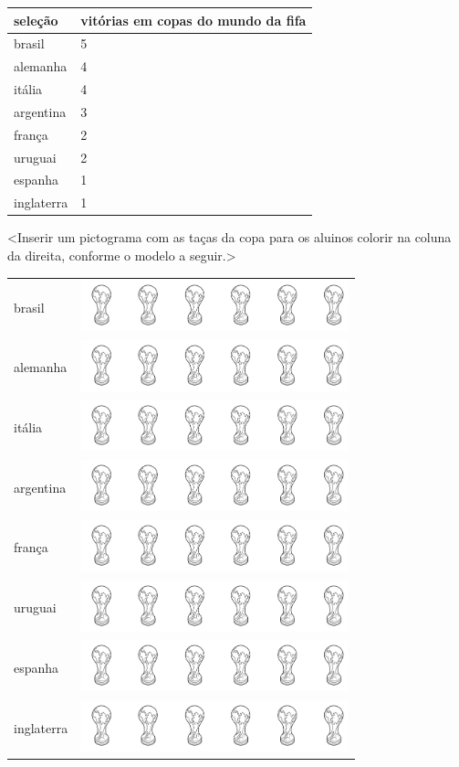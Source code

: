 \begin{longtable}[]{@{}ll@{}}
\toprule
seleção & vitórias em copas do mundo da fifa\tabularnewline
\midrule
\endhead
brasil & 5\tabularnewline
alemanha & 4\tabularnewline
itália & 4\tabularnewline
argentina & 3\tabularnewline
frança & 2\tabularnewline
uruguai & 2\tabularnewline
espanha & 1\tabularnewline
inglaterra & 1\tabularnewline
\bottomrule
\end{longtable}

\textless{}Inserir um pictograma com as taças da copa para os aluinos
colorir na coluna da direita, conforme o modelo a seguir.\textgreater{}

\begin{longtable}[]{@{}ll@{}}
\toprule
brasil &
\includegraphics[width=3.05575in,height=0.58176in]{media/image105.png}\tabularnewline
alemanha &
\includegraphics[width=3.05575in,height=0.58176in]{media/image105.png}\tabularnewline
itália &
\includegraphics[width=3.05575in,height=0.58176in]{media/image105.png}\tabularnewline
argentina &
\includegraphics[width=3.05575in,height=0.58176in]{media/image105.png}\tabularnewline
frança &
\includegraphics[width=3.05575in,height=0.58176in]{media/image105.png}\tabularnewline
uruguai &
\includegraphics[width=3.05575in,height=0.58176in]{media/image105.png}\tabularnewline
espanha &
\includegraphics[width=3.05575in,height=0.58176in]{media/image105.png}\tabularnewline
inglaterra &
\includegraphics[width=3.05575in,height=0.58176in]{media/image105.png}\tabularnewline
\bottomrule
\end{longtable}

